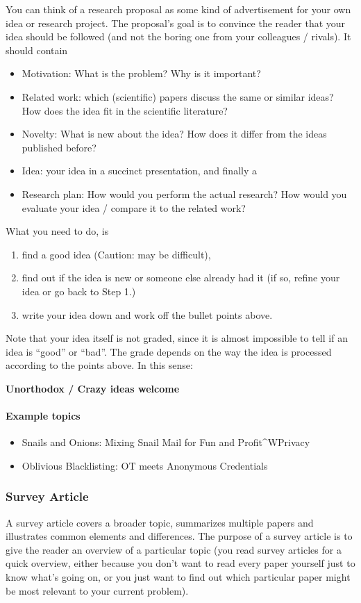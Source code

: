 \documentclass[twocolumn, a4paper, 10pt]{article}
\begin{document}
You can think of a research proposal as some kind of advertisement for your own idea or research project. The proposal's goal is to convince the reader that your idea should be followed (and not the boring one from your colleagues / rivals).
It should contain
\begin{itemize}
	\item Motivation: What is the problem? Why is it important?
	\item Related work: which (scientific) papers discuss the same or similar ideas? How does the idea fit in the scientific literature?
	\item Novelty: What is new about the idea? How does it differ from the ideas published before?
	\item Idea: your idea in a succinct presentation, and finally a
	\item Research plan: How would you perform the actual research? How would you evaluate your idea / compare it to the related work?
\end{itemize}

\noindent What you need to do, is
\begin{enumerate}
	\item find a good idea (Caution: may be difficult),
	\item find out if the idea is new or someone else already had it (if so, refine your idea or go back to Step 1.) 
	\item write your idea down and work off the bullet points above.
\end{enumerate}
Note that your idea itself is not graded, since it is almost impossible to tell if an idea is ``good'' or ``bad''. The grade depends on the way the idea is processed according to the points above. In this sense:

\begin{center}
\bfseries
		Unorthodox / Crazy ideas welcome
\end{center}
\paragraph{Example topics}
\begin{itemize}
	\item Snails and Onions: Mixing Snail Mail for Fun and Profit\^{}WPrivacy
	\item Oblivious Blacklisting: OT meets Anonymous Credentials 
\end{itemize}

\subsubsection{Survey Article}
A survey article covers a broader topic, summarizes multiple papers and illustrates common elements and differences. The purpose of a survey article is to give the reader an overview of a particular topic (you read survey articles for a quick overview, either because you don't want to read every paper yourself just to know what’s going on, or you just want to find out which particular paper might be most relevant to your current problem). 
\end{document}
